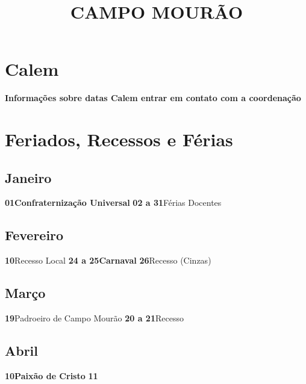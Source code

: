\documentclass[thesis]{hmcposter}
\author{ }
\title{CAMPO MOURÃO}
\begin{document}
\begin{poster}
\normalsize\section{\color{hmcorange}Calem}\textbf{Informações sobre datas Calem entrar em contato com a coordenação} \newpage\onespacing \small \section{\color{hmcorange}Feriados, Recessos e Férias}\subsection{Janeiro}\textbf{01}\quad \quad \quad \quad \textbf{Confraternização Universal} \newline\textbf{02 a 31}\quad \quad Férias Docentes \newline\subsection{Fevereiro}\textbf{10}\quad \quad \quad \quad Recesso Local \newline\textbf{24 a 25}\quad \quad \textbf{Carnaval} \newline\textbf{26}\quad \quad \quad \quad Recesso (Cinzas) \newline\subsection{Março}\textbf{19}\quad \quad \quad \quad Padroeiro de Campo Mourão \newline\textbf{20 a 21}\quad \quad Recesso \newline\subsection{Abril}\textbf{10}\quad \quad \quad \quad \textbf{Paixão de Cristo} \newline\textbf{11}\quad \qu
\end{poster}
\end{document}
